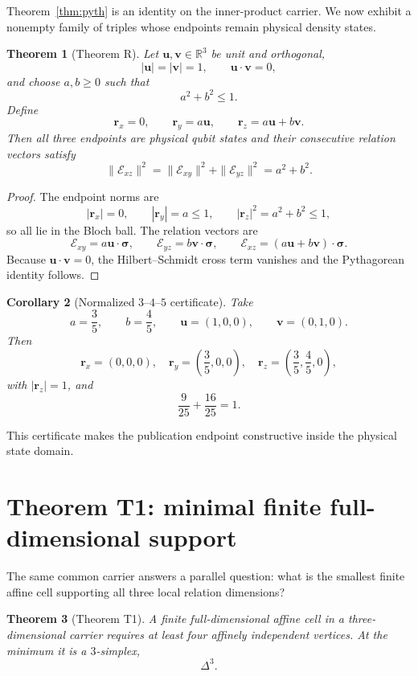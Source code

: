 \documentclass[12pt,a4paper]{article}
\newtheorem{theorem}{Theorem}[section]
\newtheorem{corollary}[theorem]{Corollary}
\newcommand{\R}{\mathbb{R}}
\newcommand{\Erel}{\mathcal{E}}
\newcommand{\sigmavec}{\bm{\sigma}}
\newcommand{\rvec}{\bm{r}}
\newcommand{\uvec}{\bm{u}}
\newcommand{\vvec}{\bm{v}}
\begin{document}
Theorem~\ref{thm:pyth} is an identity on the inner-product carrier. We now exhibit a nonempty family of triples whose endpoints remain physical density states.

\begin{theorem}[Theorem R]\label{thm:physical-pyth}
Let $\uvec,\vvec\in\R^3$ be unit and orthogonal,
\[
|\uvec|=|\vvec|=1,
\qquad
\uvec\cdot\vvec=0,
\]
and choose $a,b\ge0$ such that
\[
\boxed{a^2+b^2\le1.}
\]
Define
\[
\rvec_x=0,
\qquad
\rvec_y=a\uvec,
\qquad
\rvec_z=a\uvec+b\vvec.
\]
Then all three endpoints are physical qubit states and their consecutive relation vectors satisfy
\[
\boxed{
\|\Erel_{xz}\|^2
=\|\Erel_{xy}\|^2+\|\Erel_{yz}\|^2
=a^2+b^2.
}
\]
\end{theorem}

\begin{proof}
The endpoint norms are
\[
|\rvec_x|=0,
\qquad
|\rvec_y|=a\le1,
\qquad
|\rvec_z|^2=a^2+b^2\le1,
\]
so all lie in the Bloch ball. The relation vectors are
\[
\Erel_{xy}=a\uvec\cdot\sigmavec,
\qquad
\Erel_{yz}=b\vvec\cdot\sigmavec,
\qquad
\Erel_{xz}=(a\uvec+b\vvec)\cdot\sigmavec.
\]
Because $\uvec\cdot\vvec=0$, the Hilbert--Schmidt cross term vanishes and the Pythagorean identity follows.
\end{proof}

\begin{corollary}[Normalized $3$--$4$--$5$ certificate]\label{cor:345}
Take
\[
a=\frac35,
\qquad
b=\frac45,
\qquad
\uvec=(1,0,0),
\qquad
\vvec=(0,1,0).
\]
Then
\[
\rvec_x=(0,0,0),
\quad
\rvec_y=\left(\frac35,0,0\right),
\quad
\rvec_z=\left(\frac35,\frac45,0\right),
\]
with $|\rvec_z|=1$, and
\[
\boxed{
\frac9{25}+\frac{16}{25}=1.
}
\]
\end{corollary}

This certificate makes the publication endpoint constructive inside the physical state domain.

\section{Theorem T1: minimal finite full-dimensional support}

The same common carrier answers a parallel question: what is the smallest finite affine cell supporting all three local relation dimensions?

\begin{theorem}[Theorem T1]\label{thm:simplex}
A finite full-dimensional affine cell in a three-dimensional carrier requires at least four affinely independent vertices. At the minimum it is a $3$-simplex,
\[
\boxed{\Delta^3.}
\]
\end{theorem}
\end{document}
